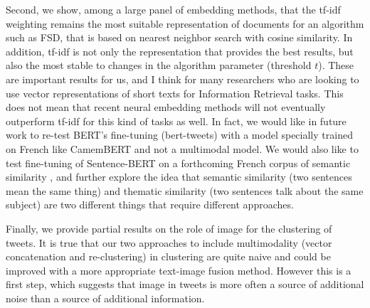 Second, we show, among a large panel of embedding methods, that the tf-idf weighting remains the most suitable representation of documents for an algorithm such as FSD, that is based on nearest neighbor search with cosine similarity. In addition, tf-idf is not only the representation that provides the best results, but also the most stable to changes in the algorithm parameter (threshold $t$). These are important results for us, and I think for many researchers who are looking to use vector representations of short texts for Information Retrieval tasks. This does not mean that recent neural embedding methods will not eventually outperform tf-idf for this kind of tasks as well. In fact, we would like in future work to re-test BERT's fine-tuning (bert-tweets) with a model specially trained on French like CamemBERT \citep{martin2020camembert} and not a multimodal model. We would also like to test fine-tuning of Sentence-BERT on a forthcoming French corpus of semantic similarity \citep{cardon2020french}, and further explore the idea that semantic similarity (two sentences mean the same thing) and thematic similarity (two sentences talk about the same subject) are two different things that require different approaches.

Finally, we provide partial results on the role of image for the clustering of tweets. It is true that our two approaches to include multimodality (vector concatenation and re-clustering) in clustering are quite naive and could be improved with a more appropriate text-image fusion method. However this is a first step, which suggests that image in tweets is more often a source of additional noise than a source of additional information.



